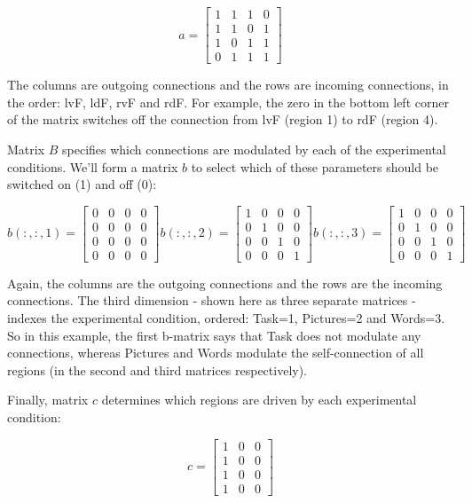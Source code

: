 \documentclass{article}
\begin{document}
\[
 a=\begin{bmatrix}
  1 & 1 & 1 & 0 \\
  1 & 1 & 0 & 1 \\
  1 & 0 & 1 & 1 \\
  0 & 1 & 1 & 1
 \end{bmatrix}
\]

The columns are outgoing connections and the rows are incoming connections, in the order: lvF, ldF, rvF and rdF. For example, the zero in the bottom left corner of the matrix switches off the connection from lvF (region 1) to rdF (region 4). 

Matrix \(B\) specifies which connections are modulated by each of the experimental conditions. We'll form a matrix \(b\) to select which of these parameters should be switched on (1) and off (0):

\[
 b(:,:,1)=\begin{bmatrix}
  0 & 0 & 0 & 0 \\
  0 & 0 & 0 & 0 \\
  0 & 0 & 0 & 0 \\
  0 & 0 & 0 & 0
 \end{bmatrix} 
b(:,:,2)=\begin{bmatrix}
  1 & 0 & 0 & 0 \\
  0 & 1 & 0 & 0 \\
  0 & 0 & 1 & 0 \\
  0 & 0 & 0 & 1
 \end{bmatrix} 
b(:,:,3)=\begin{bmatrix}
  1 & 0 & 0 & 0 \\
  0 & 1 & 0 & 0 \\
  0 & 0 & 1 & 0 \\
  0 & 0 & 0 & 1
 \end{bmatrix}  
\]

Again, the columns are the outgoing connections and the rows are the incoming connections. The third dimension - shown here as three separate matrices - indexes the experimental condition, ordered: Task=1, Pictures=2 and Words=3. So in this example, the first b-matrix says that Task does not modulate any connections, whereas Pictures and Words modulate the self-connection of all regions (in the second and third matrices respectively). 

Finally, matrix \(c\) determines which regions are driven by each experimental condition:

\[
c=\begin{bmatrix}
  1 & 0 & 0 \\
  1 & 0 & 0 \\
  1 & 0 & 0 \\
  1 & 0 & 0
 \end{bmatrix} 
\]
\end{document}

